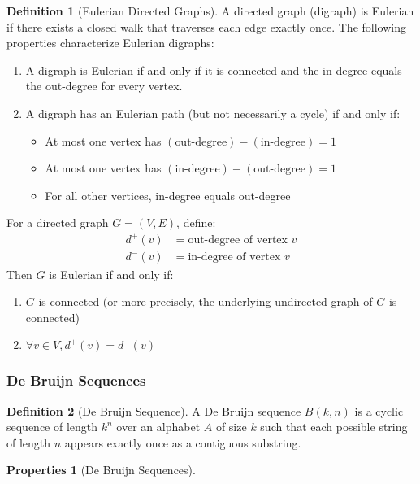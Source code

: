\documentclass{article}
\newtheorem{properties}{Properties}
\theoremstyle{definition}
\newtheorem{definition}{Definition}
\begin{document}
\begin{definition}[Eulerian Directed Graphs]
A directed graph (digraph) is Eulerian if there exists a closed walk that traverses each edge exactly once. The following properties characterize Eulerian digraphs:
\begin{enumerate}
    \item A digraph is Eulerian if and only if it is connected and the in-degree equals the out-degree for every vertex.
    \item A digraph has an Eulerian path (but not necessarily a cycle) if and only if:
    \begin{itemize}
        \item At most one vertex has $(\text{out-degree}) - (\text{in-degree}) = 1$
        \item At most one vertex has $(\text{in-degree}) - (\text{out-degree}) = 1$
        \item For all other vertices, in-degree equals out-degree
    \end{itemize}
\end{enumerate}
For a directed graph $G = (V, E)$, define:
\begin{align}
    d^+(v) &= \text{out-degree of vertex } v\\
    d^-(v) &= \text{in-degree of vertex } v
\end{align}
Then $G$ is Eulerian if and only if:
\begin{enumerate}
    \item $G$ is connected (or more precisely, the underlying undirected graph of $G$ is connected)
    \item $\forall v \in V, d^+(v) = d^-(v)$
\end{enumerate}
\end{definition}

\subsubsection{De Bruijn Sequences}


\begin{definition}[De Bruijn Sequence]
A De Bruijn sequence $B(k, n)$ is a cyclic sequence of length $k^n$ over an alphabet $A$ of size $k$ such that each possible string of length $n$ appears exactly once as a contiguous substring.
\end{definition}

\begin{properties}[De Bruijn Sequences]
\end{properties}
\vspace{0.5em} %
\end{document}
